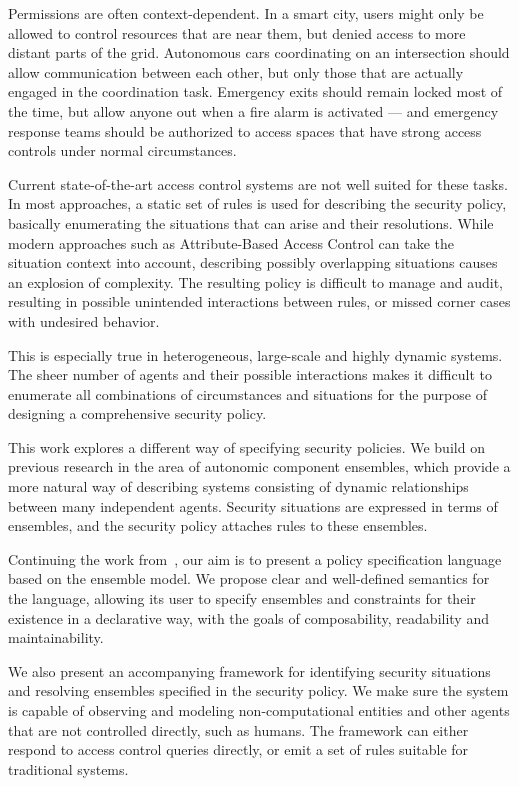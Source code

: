 Permissions are often context-dependent. In a smart city, users might only be allowed to
control resources that are near them, but denied access to more distant parts of the
grid. Autonomous cars coordinating on an intersection should allow communication between
each other, but only those that are actually engaged in the coordination task. Emergency
exits should remain locked most of the time, but allow anyone out when a fire alarm is
activated --- and emergency response teams should be authorized to access spaces that
have strong access controls under normal circumstances.

Current state-of-the-art access control systems are not well suited for these tasks. In
most approaches, a static set of rules is used for describing the security policy,
basically enumerating the situations that can arise and their resolutions. While modern
approaches such as Attribute-Based Access Control can take the situation context into
account, describing possibly overlapping situations causes an explosion of complexity.
The resulting policy is difficult to manage and audit, resulting in possible unintended
interactions between rules, or missed corner cases with undesired behavior.

This is especially true in heterogeneous, large-scale and highly dynamic systems. The
sheer number of agents and their possible interactions makes it difficult to enumerate
all combinations of circumstances and situations for the purpose of designing a
comprehensive security policy.

\bigskip

This work explores a different way of specifying security policies. We build on previous
research in the area of autonomic component ensembles, which provide a more natural way
of describing systems consisting of dynamic relationships between many independent
agents. Security situations are expressed in terms of ensembles, and the security policy
attaches rules to these ensembles.

Continuing the work from~\citep{isola2018}, our aim is to present a policy specification
language based on the ensemble model. We propose clear and well-defined semantics for
the language, allowing its user to specify ensembles and constraints for their existence
in a declarative way, with the goals of composability, readability and maintainability.

We also present an accompanying framework for identifying security situations and
resolving ensembles specified in the security policy. We make sure the system is capable
of observing and modeling non-computational entities and other agents that are not
controlled directly, such as humans. The framework can either respond to access control
queries directly, or emit a set of rules suitable for traditional systems.

